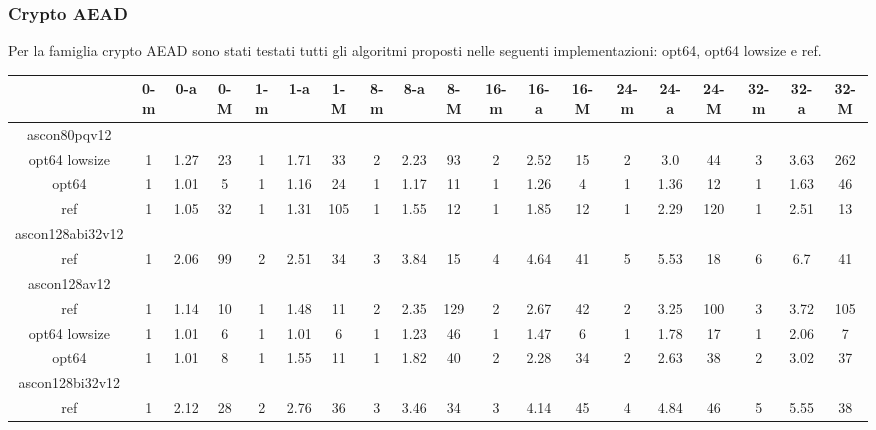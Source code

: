 \documentclass[12pt,a4paper,italian]{report}
\begin{document}
\subsubsection{Crypto AEAD}

Per la famiglia crypto AEAD sono stati testati tutti gli algoritmi proposti nelle seguenti implementazioni: opt64, opt64 lowsize e ref.

\begin{landscape}
    \begin{table}[]
        \begin{adjustbox}{width=600pt}
            \centering
			\begin{tabular}{|c|c|c|c|c|c|c|c|c|c|c|c|c|c|c|c|c|c|c|}
				\hline
				& 0-m & 0-a & 0-M & 1-m & 1-a & 1-M & 8-m & 8-a & 8-M & 16-m & 16-a & 16-M & 24-m & 24-a & 24-M & 32-m & 32-a & 32-M \\
				\hline
				ascon80pqv12 & & & & & & & & & & & & & & & & & & \\
				\hline
				opt64 lowsize & 1 & 1.27 & 23 & 1 & 1.71 & 33 & 2 & 2.23 & 93 & 2 & 2.52 & 15 & 2 & 3.0 & 44 & 3 & 3.63 & 262 \\
				\hline
				opt64 & 1 & 1.01 & 5 & 1 & 1.16 & 24 & 1 & 1.17 & 11 & 1 & 1.26 & 4 & 1 & 1.36 & 12 & 1 & 1.63 & 46 \\
				\hline
				ref & 1 & 1.05 & 32 & 1 & 1.31 & 105 & 1 & 1.55 & 12 & 1 & 1.85 & 12 & 1 & 2.29 & 120 & 1 & 2.51 & 13 \\
				\hline
				ascon128abi32v12 & & & & & & & & & & & & & & & & & & \\
				\hline
				ref & 1 & 2.06 & 99 & 2 & 2.51 & 34 & 3 & 3.84 & 15 & 4 & 4.64 & 41 & 5 & 5.53 & 18 & 6 & 6.7 & 41 \\
				\hline
				ascon128av12 & & & & & & & & & & & & & & & & & & \\
				\hline
				ref & 1 & 1.14 & 10 & 1 & 1.48 & 11 & 2 & 2.35 & 129 & 2 & 2.67 & 42 & 2 & 3.25 & 100 & 3 & 3.72 & 105 \\
				\hline
				opt64 lowsize & 1 & 1.01 & 6 & 1 & 1.01 & 6 & 1 & 1.23 & 46 & 1 & 1.47 & 6 & 1 & 1.78 & 17 & 1 & 2.06 & 7 \\
				\hline
				opt64 & 1 & 1.01 & 8 & 1 & 1.55 & 11 & 1 & 1.82 & 40 & 2 & 2.28 & 34 & 2 & 2.63 & 38 & 2 & 3.02 & 37 \\
				\hline
				ascon128bi32v12 & & & & & & & & & & & & & & & & & & \\
				\hline
				ref & 1 & 2.12 & 28 & 2 & 2.76 & 36 & 3 & 3.46 & 34 & 3 & 4.14 & 45 & 4 & 4.84 & 46 & 5 & 5.55 & 38 \\

\end{tabular}
\end{adjustbox}
\end{table}
\end{landscape}
\end{document}
